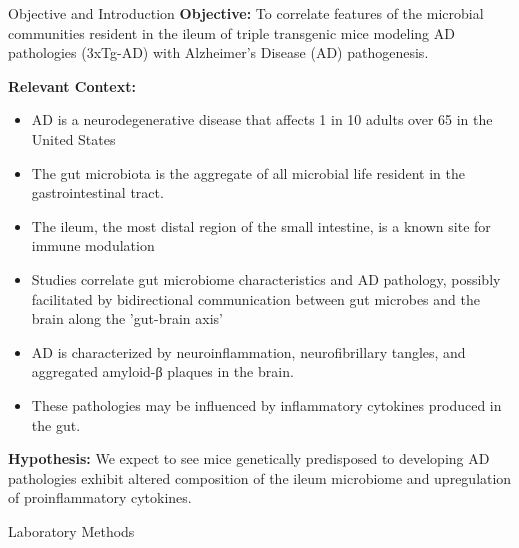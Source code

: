 \documentclass[final]{beamer}
\newlength{\colwidth}
\begin{document}
\begin{frame}[t]
\begin{columns}[t]
\begin{column}{\colwidth}
\begin{block}{Objective and Introduction}
    \textbf{Objective:} To correlate features of the microbial communities
    resident in the ileum of triple transgenic mice modeling AD pathologies
    (3xTg-AD) with Alzheimer's Disease (AD) pathogenesis.

    \textbf{Relevant Context:}
    \begin{itemize}
      \item AD is a neurodegenerative disease that affects 1 in 10 adults over 65 in the United States
      \item The gut microbiota is the aggregate of all microbial life resident in the gastrointestinal tract.
      \item The ileum, the most distal region of the small intestine, is a known site for immune modulation
      \item Studies correlate gut microbiome characteristics and AD pathology, possibly facilitated by bidirectional communication between gut microbes and the brain along the 'gut-brain axis'
      \item AD is characterized by neuroinflammation, neurofibrillary tangles, and aggregated amyloid-β plaques in the brain.
      \item These pathologies may be influenced by inflammatory cytokines produced in the gut.
    \end{itemize}

    \textbf{Hypothesis:}
    We expect to see mice genetically predisposed to developing AD
    pathologies exhibit altered composition of the ileum microbiome and
    upregulation of proinflammatory cytokines.
      
  \end{block}

  \begin{block}{Laboratory Methods}


\end{block}
\end{column}
\end{columns}
\end{frame}
\end{document}
